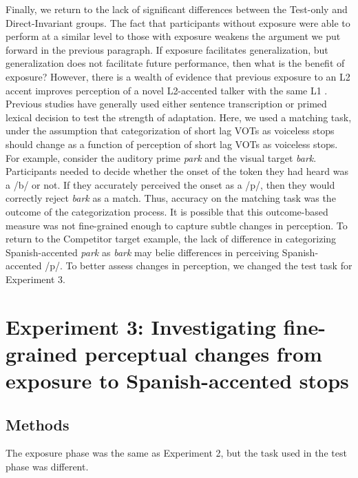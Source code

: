 \documentclass[preprint, 3p, authoryear]{elsarticle} %
\begin{document}
Finally, we return to the lack of significant differences between the Test-only and Direct-Invariant groups.
The fact that participants without exposure were able to perform at a similar level to those with exposure weakens the argument we put forward in the previous paragraph.
If exposure facilitates generalization, but generalization does not facilitate future performance, then what is the benefit of exposure?
However, there is a wealth of evidence that previous exposure to an L2 accent improves perception of a novel L2-accented talker with the same L1 \citep{bent2021}.
Previous studies have generally used either sentence transcription \citep[e.g.,][]{bradlow2008} or primed lexical decision \citep[e.g.,][]{xie2017similarity} to test the strength of adaptation.
Here, we used a matching task, under the assumption that categorization of short lag VOTs as voiceless stops should change as a function of perception of short lag VOTs as voiceless stops.
For example, consider the auditory prime \emph{park} and the visual target \emph{bark}.
Participants needed to decide whether the onset of the token they had heard was a /b/ or not.
If they accurately perceived the onset as a /p/, then they would correctly reject \emph{bark} as a match.
Thus, accuracy on the matching task was the outcome of the categorization process.
It is possible that this outcome-based measure was not fine-grained enough to capture subtle changes in perception.
To return to the Competitor target example, the lack of difference in categorizing Spanish-accented \emph{park} as \emph{bark} may belie differences in perceiving Spanish-accented /p/.
To better assess changes in perception, we changed the test task for Experiment 3.

\hypertarget{experiment-3-investigating-fine-grained-perceptual-changes-from-exposure-to-spanish-accented-stops}{%
\section{Experiment 3: Investigating fine-grained perceptual changes from exposure to Spanish-accented stops}\label{experiment-3-investigating-fine-grained-perceptual-changes-from-exposure-to-spanish-accented-stops}}

\hypertarget{methods-2}{%
\subsection{Methods}\label{methods-2}}

The exposure phase was the same as Experiment 2, but the task used in the test phase was different.
\end{document}
